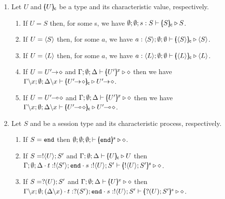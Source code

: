 \begin{proposition}
	\label{app:characteristic_inhabit}
	\begin{enumerate}
		\item	Let $U$ and $[\!\!(U)\!\!]_{\mathsf{c}}$ be a type and its characteristic value, respectively. 
		\begin{enumerate}
			\item	If $U = S$ then, for some s, we have $\emptyset; \emptyset; s: S \vdash [\!\!(S)\!\!]_{\mathsf{c}} \triangleright S$.
	
			\item	If $U = \langle S \rangle$ then, for some $a$, we have $a: \langle S \rangle; \emptyset; \emptyset \vdash [\!\!(\langle S \rangle)\!\!]_{\mathsf{c}} \triangleright \langle S \rangle$.
	
			\item	If $U = \langle L \rangle$ then, for some $a$, we have $a: \langle L \rangle; \emptyset; \emptyset \vdash [\!\!(\langle L \rangle)\!\!]_{\mathsf{c}} \triangleright \langle L \rangle$.

			\item	If $U = U'\!\! \rightarrow\! \diamond$ and  
					$\Gamma; \emptyset; \Delta \vdash [\!\!(U')\!\!]^{x} \triangleright \diamond$
					 then we have 
					$\Gamma \backslash x ; \es; \Delta \backslash x \proves \omapchar{\shot{U'}} \hastype \shot{U'}$.

			\item	If $U = U'\!\! \multimap\! \diamond$ and
					$\Gamma; \emptyset; \Delta \vdash [\!\!(U')\!\!]^{x} \triangleright \diamond$
					 then we have 
					$\Gamma \backslash x ; \es; \Delta \backslash x \proves \omapchar{\lhot{U'}} \hastype \lhot{U'}$.

		\end{enumerate}

		\item	Let $S$ and  be a session type and its characteristic process, respectively. 
		\begin{enumerate}
			\item	If $S = \mathtt{end}$ then $\emptyset; \emptyset; \emptyset; \vdash [\!\!(\mathtt{end})\!\!]^{s} \triangleright \diamond$.
	
			\item	If $S = ! \langle U \rangle ; S'$ and  
					$\Gamma; \emptyset; \Delta \vdash [\!\!(U)\!\!]_{\mathsf{c}} \triangleright U$ then \\
					$\Gamma; \emptyset; \Delta \cdot t: ! \langle S' \rangle ; \mathtt{end} \cdot s: ! \langle U \rangle ; S' \vdash [\!\!(! \langle U \rangle ; S')\!\!]^{s} \triangleright \diamond$.
	
			\item	If $S = ? (U) ; S'$ and
					$\Gamma; \emptyset; \Delta \vdash [\!\!(U)\!\!]^{x}  \triangleright \diamond$ then \\
					$\Gamma \backslash x; \emptyset; (\Delta\backslash x) \cdot t: ? (S') ; \mathtt{end} \cdot s: ! \langle U \rangle ; S' \vdash [\!\!(? (U) ; S')\!\!]^{s} \triangleright \diamond$.
	

\end{enumerate}
\end{enumerate}
\end{proposition}
